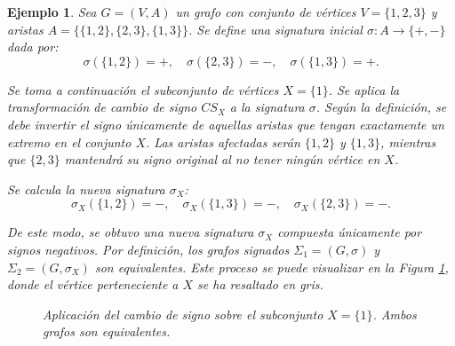 \documentclass[11pt,a4paper,spanish]{report}
\theoremstyle{plain}
\newtheorem{ejemplo}{Ejemplo}[chapter]
\begin{document}
\begin{ejemplo} \label{ej:cambio_signo_basico}
Sea $G=(V,A)$ un grafo con conjunto de vértices $V=\{1,2,3\}$ y aristas $A=\{\{1,2\}, \{2,3\}, \{1,3\}\}$. 
Se define una signatura inicial $\sigma : A \longrightarrow \{+,-\}$ dada por:
$$
\sigma(\{1,2\}) = +, \quad \sigma(\{2,3\}) = -, \quad \sigma(\{1,3\}) = +.
$$

Se toma a continuación el subconjunto de vértices $X = \{1\}$. Se aplica la transformación de cambio de signo $CS_X$ a la signatura $\sigma$. Según la definición, se debe invertir el signo únicamente de aquellas aristas que tengan exactamente un extremo en el conjunto $X$. Las aristas afectadas serán $\{1,2\}$ y $\{1,3\}$, mientras que $\{2,3\}$ mantendrá su signo original al no tener ningún vértice en $X$. 

Se calcula la nueva signatura $\sigma_X$:
$$
\sigma_X(\{1,2\}) = -, \quad \sigma_X(\{1,3\}) = -, \quad  \sigma_X(\{2,3\}) = -.
$$

De este modo, se obtuvo una nueva signatura $\sigma_X$ compuesta únicamente por signos negativos. Por definición, los grafos signados $\Sigma_1=(G,\sigma)$ y $\Sigma_2=(G,\sigma_X)$ son equivalentes. Este proceso se puede visualizar en la Figura \ref{fig:ejemplo_equivalencia}, donde el vértice perteneciente a $X$ se ha resaltado en gris.

\begin{figure}[H]
\begin{center}
\end{center}
\caption{Aplicación del cambio de signo sobre el subconjunto $X=\{1\}$. Ambos grafos son equivalentes.}
\label{fig:ejemplo_equivalencia}
\end{figure}
\end{ejemplo}
\end{document}
